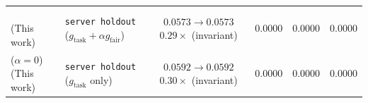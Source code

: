 \begin{table}[!t]
{\begin{tabular}{ll c ccc}
\makecell[l]{\MethodName{} \\ \scriptsize (This work)} & \makecell[l]{\texttt{server holdout} \\ \scriptsize ($g_{\mathrm{task}} {+} \alpha g_{\mathrm{fair}}$)} & \makecell{$\mathbf{0.0573} \to \mathbf{0.0573}$ \\ \scriptsize $\mathbf{0.29\times}$ (invariant)} & $0.0000$ & $0.0000$ & $0.0000$ \\
\makecell[l]{\MethodName{} ($\alpha{=}0$) \\ \scriptsize (This work)} & \makecell[l]{\texttt{server holdout} \\ \scriptsize ($g_{\mathrm{task}}$ only)} & \makecell{$0.0592 \to 0.0592$ \\ \scriptsize $0.30\times$ (invariant)} & $0.0000$ & $0.0000$ & $0.0000$ \\
\bottomrule
\end{tabular}%
}
\end{table}
